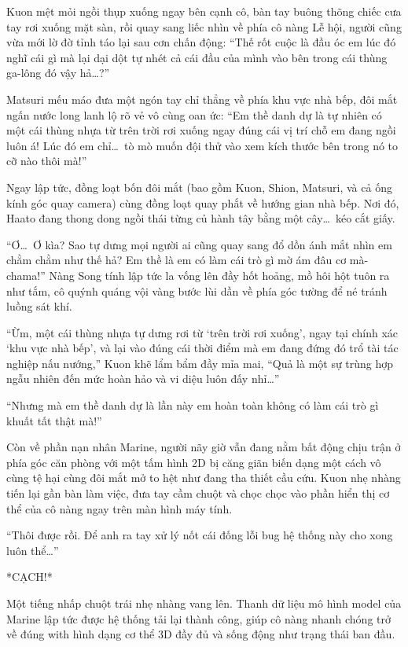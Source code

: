 \documentclass[../main.tex]{subfiles}
\begin{document}
Kuon mệt mỏi ngồi thụp xuống ngay bên cạnh cô, bàn tay buông thõng chiếc cưa tay rơi xuống mặt sàn, rồi quay sang liếc nhìn về phía cô nàng Lễ hội, người cũng vừa mới lờ đờ tỉnh táo lại sau cơn chấn động: ``Thế rốt cuộc là đầu óc em lúc đó nghĩ cái gì mà lại dại dột tự nhét cả cái đầu của mình vào bên trong cái thùng ga-lông đó vậy hả\dots?''

Matsuri mếu máo đưa một ngón tay chỉ thẳng về phía khu vực nhà bếp, đôi mắt ngấn nước long lanh lộ rõ vẻ vô cùng oan ức: ``Em thề danh dự là tự nhiên có một cái thùng nhựa từ trên trời rơi xuống ngay đúng cái vị trí chỗ em đang ngồi luôn á! Lúc đó em chỉ\dots\ tò mò muốn đội thử vào xem kích thước bên trong nó to cỡ nào thôi mà!''

Ngay lập tức, đồng loạt bốn đôi mắt (bao gồm Kuon, Shion, Matsuri, và cả ống kính góc quay camera) cùng đồng loạt quay phắt về hướng gian nhà bếp. Nơi đó, Haato đang thong dong ngồi thái từng củ hành tây bằng một cây\dots\ kéo cắt giấy.

``Ơ\dots\ Ơ kìa? Sao tự dưng mọi người ai cũng quay sang đổ dồn ánh mắt nhìn em chằm chằm như thế hả? Em thề là em có làm cái trò gì mờ ám đâu cơ mà-chama!'' Nàng Song tính lập tức la vống lên đầy hốt hoảng, mồ hôi hột tuôn ra như tắm, cô quýnh quáng vội vàng bước lùi dần về phía góc tường để né tránh luồng sát khí.

``Ừm, một cái thùng nhựa tự dưng rơi từ `trên trời rơi xuống', ngay tại chính xác `khu vực nhà bếp', và lại vào đúng cái thời điểm mà em đang đứng đó trổ tài tác nghiệp nấu nướng,'' Kuon khẽ lẩm bẩm đầy mỉa mai, ``Quả là một sự trùng hợp ngẫu nhiên đến mức hoàn hảo và vi diệu luôn đấy nhỉ\dots''

``Nhưng mà em thề danh dự là lần này em hoàn toàn không có làm cái trò gì khuất tất thật mà!''

Còn về phần nạn nhân Marine, người nãy giờ vẫn đang nằm bất động chịu trận ở phía góc căn phòng với một tấm hình 2D bị căng giãn biến dạng một cách vô cùng tệ hại cùng đôi mắt mở to hệt như đang tha thiết cầu cứu. Kuon nhẹ nhàng tiến lại gần bàn làm việc, đưa tay cầm chuột và chọc chọc vào phần hiển thị cơ thể của cô nàng ngay trên màn hình máy tính.

``Thôi được rồi. Để anh ra tay xử lý nốt cái đống lỗi bug hệ thống này cho xong luôn thể\dots''

*CẠCH!*

Một tiếng nhấp chuột trái nhẹ nhàng vang lên. Thanh dữ liệu mô hình model của Marine lập tức được hệ thống tải lại thành công, giúp cô nàng nhanh chóng trở về đúng with hình dạng cơ thể 3D đầy đủ và sống động như trạng thái ban đầu.
\end{document}

